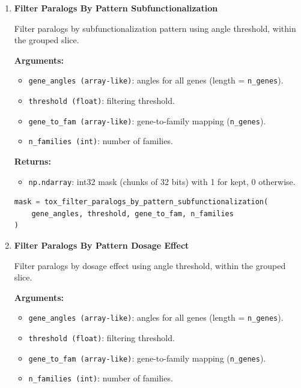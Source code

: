 \begin{enumerate}
\begin{lstlisting}[language=Python, caption={Mask Chunk Count Calculation}]
n_chunks = tox_mask_chunk_count(n_genes)
\end{lstlisting}


    \item \textbf{Filter Paralogs By Pattern Subfunctionalization}

        Filter paralogs by subfunctionalization pattern using angle threshold, within the grouped slice.

        \textbf{Arguments:}
        \begin{itemize}
            \item \lstinline!gene_angles (array-like)!: angles for all genes (length = \lstinline!n_genes!).
            \item \lstinline!threshold (float)!: filtering threshold.
            \item \lstinline!gene_to_fam (array-like)!: gene-to-family mapping (\lstinline!n_genes!).
            \item \lstinline!n_families (int)!: number of families.
        \end{itemize}

        \textbf{Returns:}
        \begin{itemize}
            \item \lstinline!np.ndarray!: int32 mask (chunks of 32 bits) with 1 for kept, 0 otherwise.
        \end{itemize}

\begin{lstlisting}[language=Python, caption={Subfunctionalization Pattern Filtering}]
mask = tox_filter_paralogs_by_pattern_subfunctionalization(
    gene_angles, threshold, gene_to_fam, n_families
)
\end{lstlisting}



    \item \textbf{Filter Paralogs By Pattern Dosage Effect}

        Filter paralogs by dosage effect using angle threshold, within the grouped slice.

        \textbf{Arguments:}
        \begin{itemize}
            \item \lstinline!gene_angles (array-like)!: angles for all genes (length = \lstinline!n_genes!).
            \item \lstinline!threshold (float)!: filtering threshold.
            \item \lstinline!gene_to_fam (array-like)!: gene-to-family mapping (\lstinline!n_genes!).
            \item \lstinline!n_families (int)!: number of families.
        \end{itemize}


\end{enumerate}
